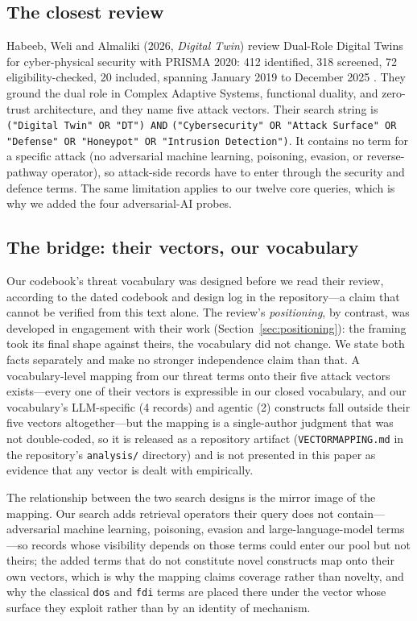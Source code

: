 \documentclass[preprint,12pt]{elsarticle}
\renewcommand{\_}{\plainunderscore\allowbreak}
\begin{document}
\subsection{The closest review}

Habeeb, Weli and Almaliki (2026, \emph{Digital Twin}) review Dual-Role Digital Twins for
cyber-physical security with PRISMA 2020: 412 identified, 318 screened, 72 eligibility-checked,
20 included, spanning January 2019 to December 2025 \cite{habeeb2026}. They ground the dual role
in Complex Adaptive Systems, functional duality, and zero-trust architecture, and they name five
attack vectors. Their search string is
\texttt{("Digital Twin" OR "DT") AND}
\texttt{("Cybersecurity" OR "Attack Surface" OR}
\texttt{"Defense" OR "Honeypot" OR "Intrusion Detection")}. It contains no term for a specific attack (no adversarial
machine learning, poisoning, evasion, or reverse-pathway operator), so attack-side records have
to enter through the security and defence terms. The same limitation applies to our twelve core
queries, which is why we added the four adversarial-AI probes.

\subsection{The bridge: their vectors, our vocabulary}

Our codebook's threat vocabulary was designed before we read their review, according to
the dated codebook and design log in the repository---a claim that cannot be verified
from this text alone. The review's \emph{positioning}, by contrast, was developed in
engagement with their work (Section~\ref{sec:positioning}): the framing took its
final shape against theirs, the vocabulary did not change. We state both facts
separately and make no stronger independence claim than that. A vocabulary-level mapping from our threat terms onto their five attack
vectors exists---every one of their vectors is expressible in our closed vocabulary,
and our vocabulary's LLM-specific (4 records) and agentic (2) constructs fall outside
their five vectors altogether---but the mapping is a single-author judgment that was
not double-coded, so it is released as a repository artifact
(\texttt{VECTOR\_MAPPING.md} in the repository's \texttt{analysis/} directory) and is
not presented in this paper as evidence
that any vector is dealt with empirically.

The relationship between the two search designs is the mirror image of the mapping. Our
search adds retrieval operators their query does not contain---adversarial machine learning,
poisoning, evasion and large-language-model terms---so records whose visibility depends on
those terms could enter our pool but not theirs; the added terms that do not constitute
novel constructs map onto their own vectors, which is why the mapping claims coverage
rather than novelty, and why the classical \texttt{dos} and \texttt{fdi} terms are placed
there under the vector whose surface they exploit rather than by an identity of mechanism.
\end{document}
